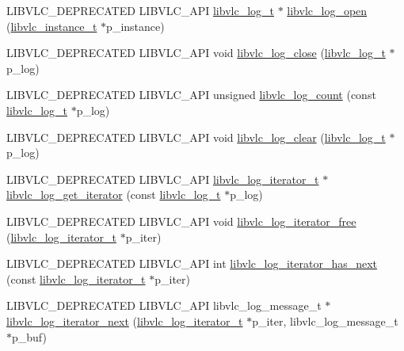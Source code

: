 \begin{DoxyCompactItemize}
\item 
L\+I\+B\+V\+L\+C\+\_\+\+D\+E\+P\+R\+E\+C\+A\+T\+ED L\+I\+B\+V\+L\+C\+\_\+\+A\+PI \hyperlink{structvlc__log__t}{libvlc\+\_\+log\+\_\+t} $\ast$ \hyperlink{group__libvlc__log_ga95dd678e1ec9d77855e83b4f45b6d04d}{libvlc\+\_\+log\+\_\+open} (\hyperlink{group__libvlc__core_ga316d739a80da4678206c79f4d6c2e284}{libvlc\+\_\+instance\+\_\+t} $\ast$p\+\_\+instance)
\item 
L\+I\+B\+V\+L\+C\+\_\+\+D\+E\+P\+R\+E\+C\+A\+T\+ED L\+I\+B\+V\+L\+C\+\_\+\+A\+PI void \hyperlink{group__libvlc__log_gad67020aad8d82e715d205bff8b17f6c1}{libvlc\+\_\+log\+\_\+close} (\hyperlink{structvlc__log__t}{libvlc\+\_\+log\+\_\+t} $\ast$p\+\_\+log)
\item 
L\+I\+B\+V\+L\+C\+\_\+\+D\+E\+P\+R\+E\+C\+A\+T\+ED L\+I\+B\+V\+L\+C\+\_\+\+A\+PI unsigned \hyperlink{group__libvlc__log_gafb00ae60f638b8bbe57029b67eaea8ec}{libvlc\+\_\+log\+\_\+count} (const \hyperlink{structvlc__log__t}{libvlc\+\_\+log\+\_\+t} $\ast$p\+\_\+log)
\item 
L\+I\+B\+V\+L\+C\+\_\+\+D\+E\+P\+R\+E\+C\+A\+T\+ED L\+I\+B\+V\+L\+C\+\_\+\+A\+PI void \hyperlink{group__libvlc__log_ga64aa12f17bc9e6ed9c3525cf55573697}{libvlc\+\_\+log\+\_\+clear} (\hyperlink{structvlc__log__t}{libvlc\+\_\+log\+\_\+t} $\ast$p\+\_\+log)
\item 
L\+I\+B\+V\+L\+C\+\_\+\+D\+E\+P\+R\+E\+C\+A\+T\+ED L\+I\+B\+V\+L\+C\+\_\+\+A\+PI \hyperlink{group__libvlc__log_ga5bc36e29d8021e6a8d06223ea2ce2262}{libvlc\+\_\+log\+\_\+iterator\+\_\+t} $\ast$ \hyperlink{group__libvlc__log_gadd31c491e4085daa56015f07cfbc5005}{libvlc\+\_\+log\+\_\+get\+\_\+iterator} (const \hyperlink{structvlc__log__t}{libvlc\+\_\+log\+\_\+t} $\ast$p\+\_\+log)
\item 
L\+I\+B\+V\+L\+C\+\_\+\+D\+E\+P\+R\+E\+C\+A\+T\+ED L\+I\+B\+V\+L\+C\+\_\+\+A\+PI void \hyperlink{group__libvlc__log_ga4aff14f443b823c7c4c7dd7badefbd58}{libvlc\+\_\+log\+\_\+iterator\+\_\+free} (\hyperlink{group__libvlc__log_ga5bc36e29d8021e6a8d06223ea2ce2262}{libvlc\+\_\+log\+\_\+iterator\+\_\+t} $\ast$p\+\_\+iter)
\item 
L\+I\+B\+V\+L\+C\+\_\+\+D\+E\+P\+R\+E\+C\+A\+T\+ED L\+I\+B\+V\+L\+C\+\_\+\+A\+PI int \hyperlink{group__libvlc__log_ga2bd68048a0d546807e8c91ba78c83e50}{libvlc\+\_\+log\+\_\+iterator\+\_\+has\+\_\+next} (const \hyperlink{group__libvlc__log_ga5bc36e29d8021e6a8d06223ea2ce2262}{libvlc\+\_\+log\+\_\+iterator\+\_\+t} $\ast$p\+\_\+iter)
\item 
L\+I\+B\+V\+L\+C\+\_\+\+D\+E\+P\+R\+E\+C\+A\+T\+ED L\+I\+B\+V\+L\+C\+\_\+\+A\+PI libvlc\+\_\+log\+\_\+message\+\_\+t $\ast$ \hyperlink{group__libvlc__log_ga144d0134b80f6e09e977ab051289a59d}{libvlc\+\_\+log\+\_\+iterator\+\_\+next} (\hyperlink{group__libvlc__log_ga5bc36e29d8021e6a8d06223ea2ce2262}{libvlc\+\_\+log\+\_\+iterator\+\_\+t} $\ast$p\+\_\+iter, libvlc\+\_\+log\+\_\+message\+\_\+t $\ast$p\+\_\+buf)
\end{DoxyCompactItemize}

